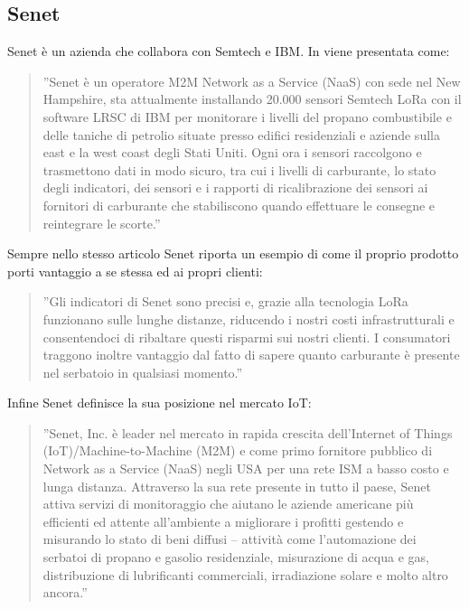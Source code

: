 \documentclass[a4paper]{report} %
\begin{document}
\subsection{Senet}
Senet è un azienda che collabora con Semtech e IBM. In \cite{art:rif.26} viene presentata come:
\begin{quote}
	''Senet è un operatore M2M Network as a Service (NaaS) con sede nel New Hampshire, sta attualmente installando 20.000 sensori Semtech LoRa con il software LRSC di IBM per monitorare i livelli del propano combustibile e delle taniche di petrolio situate presso edifici residenziali e aziende sulla east e la west coast degli Stati Uniti. Ogni ora i sensori raccolgono e trasmettono dati in modo sicuro, tra cui i livelli di carburante, lo stato degli indicatori, dei sensori e i rapporti di ricalibrazione dei sensori ai fornitori di carburante che stabiliscono quando effettuare le consegne e reintegrare le scorte.''
\end{quote}
Sempre nello stesso articolo Senet riporta un esempio di come il proprio prodotto porti vantaggio a se stessa ed ai propri clienti:
\begin{quote}
	''Gli indicatori di Senet sono precisi e, grazie alla tecnologia LoRa funzionano sulle lunghe distanze, riducendo i nostri costi infrastrutturali e consentendoci di ribaltare questi risparmi sui nostri clienti. I consumatori traggono inoltre vantaggio dal fatto di sapere quanto carburante è presente nel serbatoio in qualsiasi momento.''
\end{quote}
Infine Senet definisce la sua posizione nel mercato IoT:
\begin{quote}
	''Senet, Inc. è leader nel mercato in rapida crescita dell'Internet of Things (IoT)/Machine-to-Machine (M2M) e come primo fornitore pubblico di Network as a Service (NaaS) negli USA per una rete ISM a basso costo e lunga distanza. Attraverso la sua rete presente in tutto il paese, Senet attiva servizi di monitoraggio che aiutano le aziende americane più efficienti ed attente all'ambiente a migliorare i profitti gestendo e misurando lo stato di beni diffusi -- attività come l'automazione dei serbatoi di propano e gasolio residenziale, misurazione di acqua e gas, distribuzione di lubrificanti commerciali, irradiazione solare e molto altro ancora.''
\end{quote}
\end{document}

